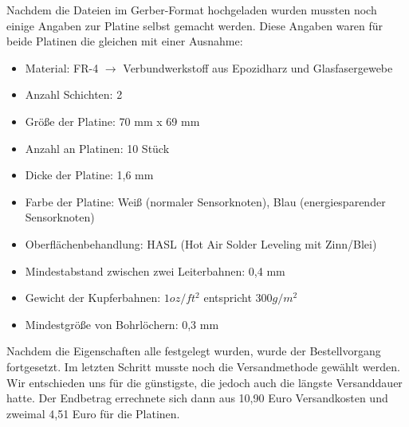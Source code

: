 Nachdem die Dateien im Gerber-Format hochgeladen wurden mussten noch einige Angaben zur Platine selbst gemacht werden. Diese Angaben waren für beide Platinen die gleichen mit einer Ausnahme:
\begin{itemize}
	\item Material: FR-4 $\rightarrow$ Verbundwerkstoff aus Epozidharz und Glasfasergewebe
	\item Anzahl Schichten: 2
	\item Größe der Platine: 70 mm x 69 mm
	\item Anzahl an Platinen: 10 Stück
	\item Dicke der Platine: 1,6 mm
	\item Farbe der Platine: Weiß (normaler Sensorknoten), Blau (energiesparender Sensorknoten) 
	\item Oberflächenbehandlung: HASL (Hot Air Solder Leveling mit Zinn/Blei)
	\item Mindestabstand zwischen zwei Leiterbahnen: 0,4 mm
	\item Gewicht der Kupferbahnen: $1 oz/ft^2$  entspricht $300 g/m^2$
	\item Mindestgröße von Bohrlöchern: 0,3 mm
\end{itemize}
Nachdem die Eigenschaften alle festgelegt wurden, wurde der Bestellvorgang fortgesetzt. Im letzten Schritt musste noch die Versandmethode gewählt werden. Wir entschieden uns für die günstigste, die jedoch auch die längste Versanddauer hatte. Der Endbetrag errechnete sich dann aus 10,90 Euro Versandkosten und zweimal 4,51 Euro für die Platinen.

